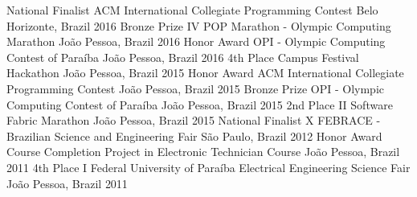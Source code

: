 



\begin{cvhonors}

  \cvhonor
    {National Finalist} %
    {ACM International Collegiate Programming Contest} %
    {Belo Horizonte, Brazil} %
    {2016} %
  \cvhonor
    {Bronze Prize} %
    {IV POP Marathon - Olympic Computing Marathon} %
    {João Pessoa, Brazil} %
    {2016} %
  \cvhonor
    {Honor Award} %
    {OPI - Olympic Computing Contest of Paraíba} %
    {João Pessoa, Brazil} %
    {2016} %
  \cvhonor
    {4th Place} %
    {Campus Festival Hackathon} %
    {João Pessoa, Brazil} %
    {2015} %
  \cvhonor
    {Honor Award} %
    {ACM International Collegiate Programming Contest} %
    {João Pessoa, Brazil} %
    {2015} %
  \cvhonor
    {Bronze Prize} %
    {OPI - Olympic Computing Contest of Paraíba} %
    {João Pessoa, Brazil} %
    {2015} %
  \cvhonor
    {2nd Place} %
    {II Software Fabric Marathon} %
    {João Pessoa, Brazil} %
    {2015} %
  \cvhonor
    {National Finalist} %
    {X FEBRACE - Brazilian Science and Engineering Fair} %
    {São Paulo, Brazil} %
    {2012} %
  \cvhonor
    {Honor Award} %
    {Course Completion Project in Electronic Technician Course} %
    {João Pessoa, Brazil} %
    {2011} %
  \cvhonor
    {4th Place} %
    {I Federal University of Paraíba Electrical Engineering Science Fair} %
    {João Pessoa, Brazil} %
    {2011} %
\end{cvhonors}
